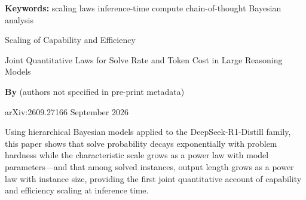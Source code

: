 \documentclass[10pt,twocolumn]{article}
\begin{document}
\setlength{\parindent}{0pt}
\setlength{\parskip}{4pt}

{\small\color{keywordgray}\textbf{Keywords:}
  scaling laws \textbullet{}
  inference-time compute \textbullet{}
  chain-of-thought \textbullet{}
  Bayesian analysis}\par\vspace{4pt}

{\LARGE\bfseries\raggedright
  Scaling of Capability and Efficiency}\par\vspace{4pt}

{\large\itshape\raggedright
  Joint Quantitative Laws for Solve Rate and Token Cost
  in Large Reasoning Models}\par\vspace{6pt}

{\small\textbf{By} (authors not specified in pre-print metadata)}\par\vspace{2pt}

{\small\color{keywordgray}arXiv:2609.27166 \textbullet{} September 2026}
\par\vspace{2pt}\noindent{\color{rulered}\rule{\columnwidth}{0.6pt}}\vspace{6pt}

Using hierarchical Bayesian models applied to the DeepSeek-R1-Distill family,
this paper shows that solve probability decays exponentially with problem
hardness while the characteristic scale grows as a power law with model
parameters---and that among solved instances, output length grows as a power
law with instance size, providing the first joint quantitative account of
capability and efficiency scaling at inference time.
\end{document}
